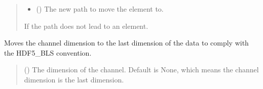 \documentclass[letterpaper,10pt,english]{sphinxmanual}
\begin{document}
\begin{fulllineitems}
\begin{fulllineitems}
\begin{quote}
\begin{description}
\begin{itemize}
\item {} 
\sphinxAtStartPar
{} () \textendash{} The new path to move the element to.

\end{itemize}

\sphinxAtStartPar
{\hyperref[\detokenize{source/HDF5_BLS:HDF5_BLS.WrapperError.WrapperError_StructureError}]{}} \textendash{} If the path does not lead to an element.

\end{description}\end{quote}

\end{fulllineitems}


\begin{fulllineitems}
\label{\detokenize{source/HDF5_BLS:HDF5_BLS.wrapper.Wrapper.move_channel_dimension_to_last}}
\pysigstartsignatures
\pysiglinewithargsret
{}
{\sphinxparamcomma {}}
{}
\pysigstopsignatures
\sphinxAtStartPar
Moves the channel dimension to the last dimension of the data to comply with the HDF5\_BLS convention.
\begin{quote}\begin{description}
\sphinxAtStartPar
{} (\sphinxstyleliteralemphasis{\sphinxupquote{, }}) \textendash{} The dimension of the channel. Default is None, which means the channel dimension is the last dimension.

\end{description}\end{quote}

\end{fulllineitems}



\end{fulllineitems}
\end{document}
